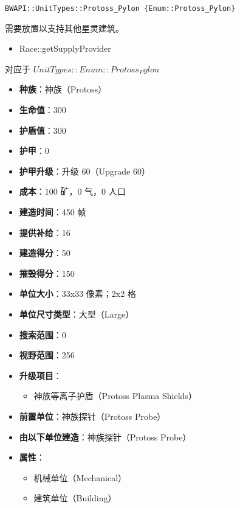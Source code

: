 \begin{tcolorbox}[colback=white, colframe=black!60!white, title=Protoss\_Pylon(), arc=0mm]
    \begin{verbatim}
BWAPI::UnitTypes::Protoss_Pylon {Enum::Protoss_Pylon}
    \end{verbatim}
    需要放置以支持其他星灵建筑。
    \begin{refer}
        \begin{itemize}
            \item Race::getSupplyProvider
        \end{itemize}
    \end{refer}
    对应于  $ UnitTypes::Enum::Protoss_Pylon $ 
    \begin{itemize}
        \item \textbf{种族}：神族（Protoss）
        \item \textbf{生命值}：300
        \item \textbf{护盾值}：300
        \item \textbf{护甲}：0
        \item \textbf{护甲升级}：升级 60（Upgrade 60）
        \item \textbf{成本}：100 矿，0 气，0 人口
        \item \textbf{建造时间}：450 帧
        \item \textbf{提供补给}：16
        \item \textbf{建造得分}：50
        \item \textbf{摧毁得分}：150
        \item \textbf{单位大小}：33x33 像素；2x2 格
        \item \textbf{单位尺寸类型}：大型（Large）
        \item \textbf{搜索范围}：0
        \item \textbf{视野范围}：256
        \item \textbf{升级项目}：
            \begin{itemize}
                \item 神族等离子护盾（Protoss Plasma Shields）
            \end{itemize}
        \item \textbf{前置单位}：神族探针（Protoss Probe）
        \item \textbf{由以下单位建造}：神族探针（Protoss Probe）
        \item \textbf{属性}：
            \begin{itemize}
                \item 机械单位（Mechanical）
                \item 建筑单位（Building）
            \end{itemize}
    \end{itemize}
\end{tcolorbox}

